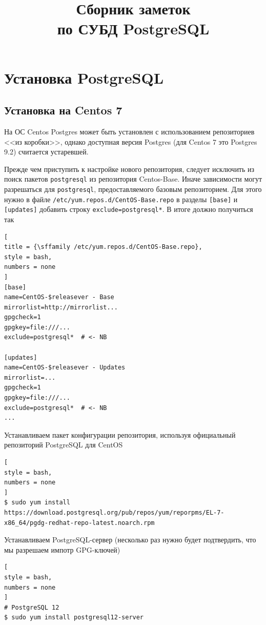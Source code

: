 \documentclass[%
	11pt,
	a4paper,
	utf8,
		]{article}
\begin{document}
\title{Сборник заметок\\по СУБД PostgreSQL}

\author{}

\date{}
\maketitle

\thispagestyle{fancy}

\tableofcontents

\section{Установка PostgreSQL}

\subsection{Установка на Centos 7}

На ОС Centos Postgres может быть установлен с использованием репозиториев <<из коробки>>, однако доступная версия Postgres (для Centos 7 это Postgres 9.2) считается устаревшей.

Прежде чем приступить к настройке нового репозитория, следует исключить из поиск пакетов \verb|postgresql| из репозитория Centos-Base. Иначе зависимости могут разрешаться для \verb|postgresql|, предоставляемого базовым репозиторием. Для этого нужно в файле \verb|/etc/yum.repos.d/CentOS-Base.repo| в разделы \verb|[base]| и \verb|[updates]| добавить строку \verb*|exclude=postgresql*|. В итоге должно получиться так
\begin{lstlisting}[
title = {\sffamily /etc/yum.repos.d/CentOS-Base.repo},
style = bash,
numbers = none	
]
[base]
name=CentOS-$releasever - Base
mirrorlist=http://mirrorlist...
gpgcheck=1
gpgkey=file:///...
exclude=postgresql*  # <- NB

[updates]
name=CentOS-$releasever - Updates
mirrorlist=...
gpgcheck=1
gpgkey=file:///...
exclude=postgresql*  # <- NB
...
\end{lstlisting}

Устанавливаем пакет конфигурации репозитория, используя официальный репозиторий PostgreSQL для CentOS
\begin{lstlisting}[
style = bash,
numbers = none
]
$ sudo yum install https://download.postgresql.org/pub/repos/yum/reporpms/EL-7-x86_64/pgdg-redhat-repo-latest.noarch.rpm
\end{lstlisting}

Устанавливаем PostgreSQL-сервер (несколько раз нужно будет подтвердить, что мы разрешаем импотр GPG-ключей)
\begin{lstlisting}[
style = bash,
numbers = none
]
# PostgreSQL 12
$ sudo yum install postgresql12-server
\end{lstlisting}
\end{document}
